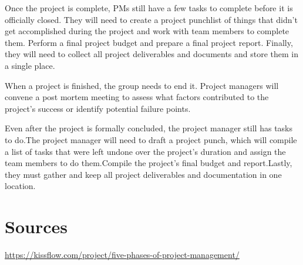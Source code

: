 \documentclass{article}
\begin{document}
Once the project is complete, PMs still have a few tasks to complete before it is officially closed. They will need to create a project punchlist of things that didn’t get accomplished during the project and work with team members to complete them. Perform a final project budget and prepare a final project report. Finally, they will need to collect all project deliverables and  documents and store them in a single place. 

When a project is finished, the group needs to end it. Project managers will convene a post mortem meeting to assess what factors contributed to the project's success or identify potential failure points.

Even after the project is formally concluded, the project manager still has tasks to do.The project manager will need to draft a project punch, which will compile a list of tasks that were left undone over the project's duration and assign the team members to do them.Compile the project's final budget and report.Lastly, they must gather and keep all project deliverables and documentation in one location.    

\break



\section{Sources}
\url{https://kissflow.com/project/five-phases-of-project-management/}
\end{document}
